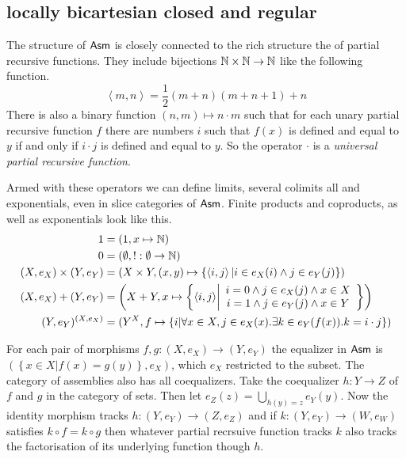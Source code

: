 \documentclass{amsart}
\theoremstyle{plain}
\theoremstyle{definition}
\newcommand\hide[1]{}
\newcommand\set[1]{\left\{#1\right\}}
\begin{document}
\subsection{locally bicartesian closed and regular}
\newcommand\pair[2]{\left\langle #1,#2\right\rangle}
The structure of $\mathsf{Asm}$ is closely connected to the rich structure the of partial recursive functions.
They include bijections $\mathbb N\times \mathbb N\to \mathbb N$ like the following function.
\[ \pair mn = \frac12(m+n)(m+n+1)+n\]
There is also a binary function $(n,m)\mapsto n\cdot m$ such that for each unary partial recursive function $f$ there are numbers $i$ such that $f(x)$ is defined and equal to $y$ if and only if $i\cdot j$ is defined and equal to $y$. So the operator $\cdot$ is a \emph{universal partial recursive function}.

Armed with these operators we can define limits, several colimits all and exponentials, even in slice categories of $\mathsf{Asm}$. Finite products and coproducts, as well as exponentials look like this.
\begin{align*}
1 &= (1,x\mapsto \N)\\
0 &= (\emptyset,!:\emptyset\to \N)\\
(X,e_X)\times (Y,e_Y) &= (X\times Y, (x,y) \mapsto \set{\pair ij|i\in e_X(i)\land j\in e_Y(j)})\\
(X,e_X)+(Y,e_Y) &= \left(X + Y, x \mapsto \set{\pair ij\middle|\begin{array}{c} i=0\land j\in e_X(j) \land x\in X \\ i=1\land j\in e_Y(j) \land x\in Y\end{array}}\right)\\
(Y,e_Y)^{(X,e_X)} &= (Y^X , f\mapsto \set{i|\forall x\in X, j\in e_X(x).\exists k\in e_Y(f(x)). k=i\cdot j } )
\end{align*}

For each pair of morphisms $f,g:(X,e_X)\to(Y,e_Y)$ the equalizer in $\mathsf{Asm}$ is $(\set{x\in X|f(x)=g(y)}, e_X)$, which $e_X$ restricted to the subset. The category of assemblies also has all coequalizers. Take the coequalizer $h:Y\to Z$ of $f$ and $g$ in the category of sets. Then let $e_Z(z) = \bigcup_{h(y)=z}e_Y(y)$. Now the identity morphism tracks $h:(Y,e_Y) \to (Z,e_Z)$ and if $k:(Y,e_Y)\to (W,e_W)$ satisfies $k\circ f = k\circ g$ then whatever partial recrsuive function tracks $k$ also tracks the factorisation of its underlying function though $h$.

\hide{Bij $\nabla$ heel goed uitleggen wat het verschil is tussen regular en coequalizer behoudend.}
\end{document}
